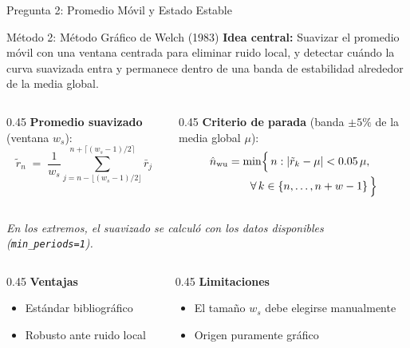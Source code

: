 \documentclass[aspectratio=169, 10pt]{beamer}
\begin{document}
\begin{frame}{Pregunta 2: Promedio Móvil y Estado Estable}
	\begin{alertblock}{Método 2: Método Gráfico de Welch (1983)}
		\justifying
		\textbf{Idea central:} Suavizar el promedio móvil con una ventana centrada para eliminar
		ruido local, y detectar cuándo la curva suavizada entra y permanece
		dentro de una banda de estabilidad alrededor de la media global.\\[4pt]
		\begin{columns}[T]
			\begin{column}{0.45\textwidth}
				\textbf{Promedio suavizado} (ventana $w_s$):
				\[
					\tilde{r}_n \;=\; \frac{1}{w_s}\sum_{j=n-\lfloor (w_s-1)/2\rfloor}^{n+\lceil (w_s-1)/2\rceil} \bar{r}_j
				\]
			\end{column}
			\begin{column}{0.45\textwidth}
				\textbf{Criterio de parada} (banda $\pm 5\%$ de la media global $\mu$):
				\[
					\begin{aligned}
						\hat{n}_{\text{wu}}
						 & =
						\min\Bigl\{\,n :
						|\tilde{r}_{k} - \mu| < 0.05\,\mu,             \\
						 & \qquad \forall\, k \in \{n, \ldots, n+w-1\}
						\,\Bigr\}
					\end{aligned}
				\]
			\end{column}
		\end{columns}
		\vspace{4pt}
		\textit{\small En los extremos, el suavizado se calculó con los datos disponibles (\texttt{min\_periods=1}).}\\[4pt]
		\begin{columns}[T]
			\begin{column}{0.45\textwidth}
				\textbf{Ventajas}
				\begin{itemize}\small
					\item Estándar bibliográfico
					\item Robusto ante ruido local
				\end{itemize}
			\end{column}
			\begin{column}{0.45\textwidth}
				\textbf{Limitaciones}
				\begin{itemize}\small
					\item El tamaño $w_s$ debe elegirse manualmente
					\item Origen puramente gráfico
				\end{itemize}
			\end{column}
		\end{columns}
	\end{alertblock}
\end{frame}
\end{document}
